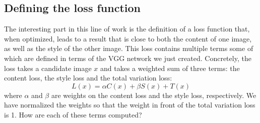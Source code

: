 \documentclass[]{book}
\newenvironment{Shaded}{\begin{snugshade}}{\end{snugshade}}
\newcommand{\KeywordTok}[1]{\textcolor[rgb]{0.13,0.29,0.53}{\textbf{#1}}}
\newcommand{\DecValTok}[1]{\textcolor[rgb]{0.00,0.00,0.81}{#1}}
\newcommand{\SpecialCharTok}[1]{\textcolor[rgb]{0.00,0.00,0.00}{#1}}
\newcommand{\StringTok}[1]{\textcolor[rgb]{0.31,0.60,0.02}{#1}}
\newcommand{\CommentTok}[1]{\textcolor[rgb]{0.56,0.35,0.01}{\textit{#1}}}
\newcommand{\ControlFlowTok}[1]{\textcolor[rgb]{0.13,0.29,0.53}{\textbf{#1}}}
\newcommand{\OperatorTok}[1]{\textcolor[rgb]{0.81,0.36,0.00}{\textbf{#1}}}
\newcommand{\BuiltInTok}[1]{#1}
\newcommand{\NormalTok}[1]{#1}
\theoremstyle{definition}
\theoremstyle{definition}
\theoremstyle{definition}
\theoremstyle{remark}
\begin{document}
\begin{Shaded}
\end{Shaded}

\subsection{Defining the loss
function}\label{defining-the-loss-function}

The interesting part in this line of work is the definition of a loss
function that, when optimized, leads to a result that is close to both
the content of one image, as well as the style of the other image. This
loss contains multiple terms some of which are defined in terms of the
VGG network we just created. Concretely, the loss takes a candidate
image \(x\) and takes a weighted sum of three terms: the content loss,
the style loss and the total variation loss: \[
L(x) = \alpha C(x) + \beta S(x) + T(x)
\] where \(\alpha\) and \(\beta\) are weights on the content loss and
the style loss, respectively. We have normalized the weights so that the
weight in front of the total variation loss is 1. How are each of these
terms computed?
\end{document}
